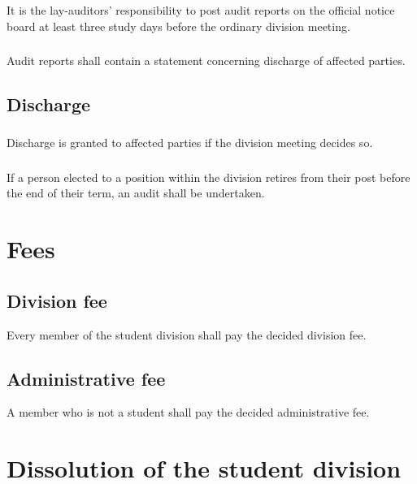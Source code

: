 \documentclass[a4paper]{dtek}
\begin{document}
\subsubsection{}
It is the lay-auditors' responsibility to post audit reports on the official notice board at least three study days before the ordinary division meeting. 

\subsubsection{}
Audit reports shall contain a statement concerning discharge of affected parties. 

\subsection{Discharge}
\subsubsection{}
Discharge is granted to affected parties if the division meeting decides so. 

\subsubsection{}
If a person elected to a position within the division retires from their post before the end of their term, an audit shall be undertaken. 
\newpage

\section{Fees}
\subsection{Division fee}
Every member of the student division shall pay the decided division fee. 
\subsection{Administrative fee}
A member who is not a student shall pay the decided administrative fee. 

\newpage

\section{Dissolution of the student division}
\end{document}
